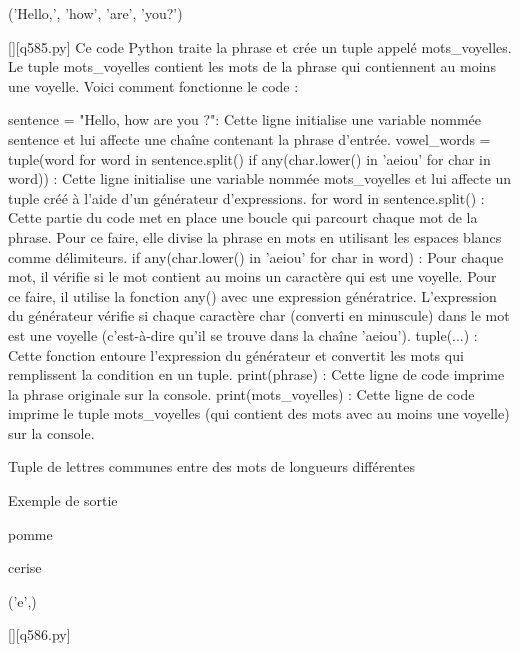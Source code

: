('Hello,', 'how', 'are', 'you?')
        \par
        \begin{solution}
            \renewcommand{\nomfichier}{q585.py}
            \pythonfile{\chemincode \nomfichier}[][\nomfichier]
            Ce code Python traite la phrase et crée un tuple appelé mots_voyelles. Le tuple mots_voyelles contient les mots de la phrase qui contiennent au moins une voyelle. Voici comment fonctionne le code :

    sentence = "Hello, how are you ?": Cette ligne initialise une variable nommée sentence et lui affecte une chaîne contenant la phrase d'entrée.
    vowel_words = tuple(word for word in sentence.split() if any(char.lower() in 'aeiou' for char in word)) : Cette ligne initialise une variable nommée mots_voyelles et lui affecte un tuple créé à l'aide d'un générateur d'expressions.
        for word in sentence.split() : Cette partie du code met en place une boucle qui parcourt chaque mot de la phrase. Pour ce faire, elle divise la phrase en mots en utilisant les espaces blancs comme délimiteurs.
        if any(char.lower() in 'aeiou' for char in word) : Pour chaque mot, il vérifie si le mot contient au moins un caractère qui est une voyelle. Pour ce faire, il utilise la fonction any() avec une expression génératrice. L'expression du générateur vérifie si chaque caractère char (converti en minuscule) dans le mot est une voyelle (c'est-à-dire qu'il se trouve dans la chaîne 'aeiou').
        tuple(...) : Cette fonction entoure l'expression du générateur et convertit les mots qui remplissent la condition en un tuple.
    print(phrase) : Cette ligne de code imprime la phrase originale sur la console.
    print(mots_voyelles) : Cette ligne de code imprime le tuple mots_voyelles (qui contient des mots avec au moins une voyelle) sur la console.
        \end{solution}
        

        \question
        Tuple de lettres communes entre des mots de longueurs différentes

Exemple de sortie

pomme

cerise

('e',)
        \par
        \begin{solution}
            \renewcommand{\nomfichier}{q586.py}
            \pythonfile{\chemincode \nomfichier}[][\nomfichier]
            
        \end{solution}
        

